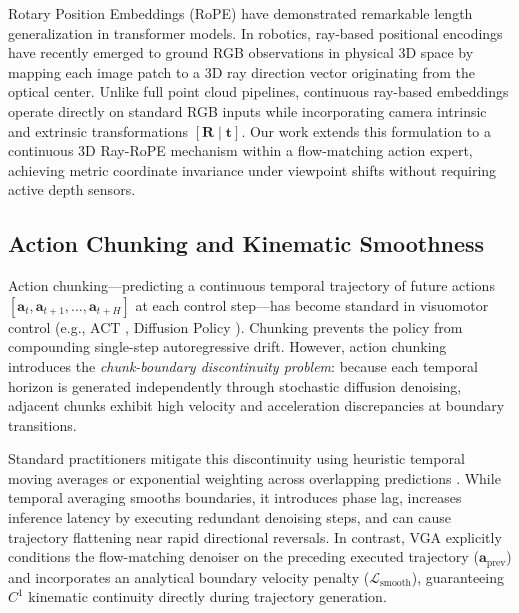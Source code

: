 Rotary Position Embeddings (RoPE) \cite{su2024roformer} have demonstrated remarkable length generalization in transformer models. In robotics, ray-based positional encodings have recently emerged to ground RGB observations in physical 3D space by mapping each image patch to a 3D ray direction vector originating from the optical center. Unlike full point cloud pipelines, continuous ray-based embeddings operate directly on standard RGB inputs while incorporating camera intrinsic and extrinsic transformations $[\mathbf{R} \mid \mathbf{t}]$. Our work extends this formulation to a continuous 3D Ray-RoPE mechanism within a flow-matching action expert, achieving metric coordinate invariance under viewpoint shifts without requiring active depth sensors.

\subsection{Action Chunking and Kinematic Smoothness}
Action chunking—predicting a continuous temporal trajectory of future actions $[\mathbf{a}_t, \mathbf{a}_{t+1}, \dots, \mathbf{a}_{t+H}]$ at each control step—has become standard in visuomotor control (e.g., ACT \cite{zhao2023act}, Diffusion Policy \cite{chi2023diffusion}). Chunking prevents the policy from compounding single-step autoregressive drift. However, action chunking introduces the \textit{chunk-boundary discontinuity problem}: because each temporal horizon is generated independently through stochastic diffusion denoising, adjacent chunks exhibit high velocity and acceleration discrepancies at boundary transitions.

Standard practitioners mitigate this discontinuity using heuristic temporal moving averages or exponential weighting across overlapping predictions \cite{zhao2023act}. While temporal averaging smooths boundaries, it introduces phase lag, increases inference latency by executing redundant denoising steps, and can cause trajectory flattening near rapid directional reversals. In contrast, VGA explicitly conditions the flow-matching denoiser on the preceding executed trajectory ($\mathbf{a}_{\text{prev}}$) and incorporates an analytical boundary velocity penalty ($\mathcal{L}_{\text{smooth}}$), guaranteeing $C^1$ kinematic continuity directly during trajectory generation.

